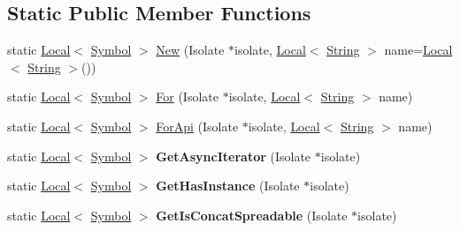 \subsection*{Static Public Member Functions}
\begin{DoxyCompactItemize}
\item 
static \mbox{\hyperlink{classv8_1_1Local}{Local}}$<$ \mbox{\hyperlink{classv8_1_1Symbol}{Symbol}} $>$ \mbox{\hyperlink{classv8_1_1Symbol_ac241ffee8282d3067f8ed0da7be2adb8}{New}} (Isolate $\ast$isolate, \mbox{\hyperlink{classv8_1_1Local}{Local}}$<$ \mbox{\hyperlink{classv8_1_1String}{String}} $>$ name=\mbox{\hyperlink{classv8_1_1Local}{Local}}$<$ \mbox{\hyperlink{classv8_1_1String}{String}} $>$())
\item 
static \mbox{\hyperlink{classv8_1_1Local}{Local}}$<$ \mbox{\hyperlink{classv8_1_1Symbol}{Symbol}} $>$ \mbox{\hyperlink{classv8_1_1Symbol_a4bde7380260d3c1cab6289a8029b34c4}{For}} (Isolate $\ast$isolate, \mbox{\hyperlink{classv8_1_1Local}{Local}}$<$ \mbox{\hyperlink{classv8_1_1String}{String}} $>$ name)
\item 
static \mbox{\hyperlink{classv8_1_1Local}{Local}}$<$ \mbox{\hyperlink{classv8_1_1Symbol}{Symbol}} $>$ \mbox{\hyperlink{classv8_1_1Symbol_af1c88cf1c86bf5254bd60013e04de941}{For\+Api}} (Isolate $\ast$isolate, \mbox{\hyperlink{classv8_1_1Local}{Local}}$<$ \mbox{\hyperlink{classv8_1_1String}{String}} $>$ name)
\item 
\mbox{\label{classv8_1_1Symbol_a9ce03e853ed34c0192bef63d88d2f9c6}} 
static \mbox{\hyperlink{classv8_1_1Local}{Local}}$<$ \mbox{\hyperlink{classv8_1_1Symbol}{Symbol}} $>$ {\bfseries Get\+Async\+Iterator} (Isolate $\ast$isolate)
\item 
\mbox{\label{classv8_1_1Symbol_ad23ee69f0680db333469272554b07a6e}} 
static \mbox{\hyperlink{classv8_1_1Local}{Local}}$<$ \mbox{\hyperlink{classv8_1_1Symbol}{Symbol}} $>$ {\bfseries Get\+Has\+Instance} (Isolate $\ast$isolate)
\item 
\mbox{\label{classv8_1_1Symbol_acf0d506838dbf518537c17a72571c0bf}} 
static \mbox{\hyperlink{classv8_1_1Local}{Local}}$<$ \mbox{\hyperlink{classv8_1_1Symbol}{Symbol}} $>$ {\bfseries Get\+Is\+Concat\+Spreadable} (Isolate $\ast$isolate)
\item 
\mbox{\label{classv8_1_1Symbol_a35aa1aca7135c5bf9052d8d067d126b1}} 

\end{DoxyCompactItemize}
